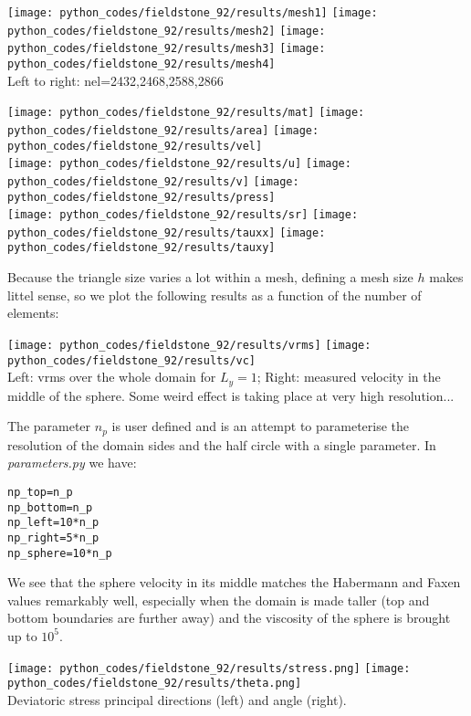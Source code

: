 \begin{center}
\texttt{[image: python\_codes/fieldstone\_92/results/mesh1]}
\texttt{[image: python\_codes/fieldstone\_92/results/mesh2]}
\texttt{[image: python\_codes/fieldstone\_92/results/mesh3]}
\texttt{[image: python\_codes/fieldstone\_92/results/mesh4]}\\
{\captionfont Left to right: nel=2432,2468,2588,2866}
\end{center}


\begin{center}
\texttt{[image: python\_codes/fieldstone\_92/results/mat]}
\texttt{[image: python\_codes/fieldstone\_92/results/area]}
\texttt{[image: python\_codes/fieldstone\_92/results/vel]}\\
\texttt{[image: python\_codes/fieldstone\_92/results/u]}
\texttt{[image: python\_codes/fieldstone\_92/results/v]}
\texttt{[image: python\_codes/fieldstone\_92/results/press]}\\
\texttt{[image: python\_codes/fieldstone\_92/results/sr]}
\texttt{[image: python\_codes/fieldstone\_92/results/tauxx]}
\texttt{[image: python\_codes/fieldstone\_92/results/tauxy]}
\end{center}

Because the triangle size varies a lot within a mesh, defining a mesh size $h$
makes littel sense, so we plot the following results as a function of the 
number of elements:

\begin{center}
\texttt{[image: python\_codes/fieldstone\_92/results/vrms]}
\texttt{[image: python\_codes/fieldstone\_92/results/vc]}\\
{\captionfont Left: vrms over the whole domain for $L_y=1$; Right: 
measured velocity in the middle of the sphere. Some weird 
effect is taking place at very high resolution...}
\end{center}

The parameter $n_p$ is user defined and is an attempt to parameterise 
the resolution of the domain sides and the half circle with a single parameter.
In {\sl parameters.py} we have:
\begin{lstlisting}
np_top=n_p
np_bottom=n_p
np_left=10*n_p
np_right=5*n_p
np_sphere=10*n_p
\end{lstlisting}

We see that the sphere velocity in its middle 
matches the Habermann and Faxen values remarkably well, 
especially when the domain is made taller (top and bottom 
boundaries are further away) and the viscosity of the 
sphere is brought up to $10^5$.


\begin{center}
\texttt{[image: python\_codes/fieldstone\_92/results/stress.png]}
\texttt{[image: python\_codes/fieldstone\_92/results/theta.png]}\\
{\captionfont Deviatoric stress principal directions (left) and angle (right).} 
\end{center}
